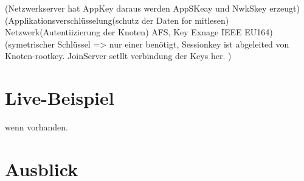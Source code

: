 \documentclass[a4paper,12pt]{article}
\begin{document}
        \cite{LoRaSecur}(Netzwerkserver hat AppKey daraus werden AppSKeay und NwkSkey erzeugt)
        \cite{WhatIsLoRa}(Applikationsverschlüsselung(schutz der Daten for mitlesen) Netzwerk(Autentiizierung der Knoten) AFS, Key Exnage IEEE EU164)
        \cite{LoRaSpec}(symetrischer Schlüssel => nur einer benötigt, Sessionkey ist abgeleited von Knoten-rootkey. JoinServer setllt verbindung der Keys her.
        )
    \section{Live-Beispiel}
        wenn vorhanden.

    \section{Ausblick}
        \newpage
    
    
\end{document}
